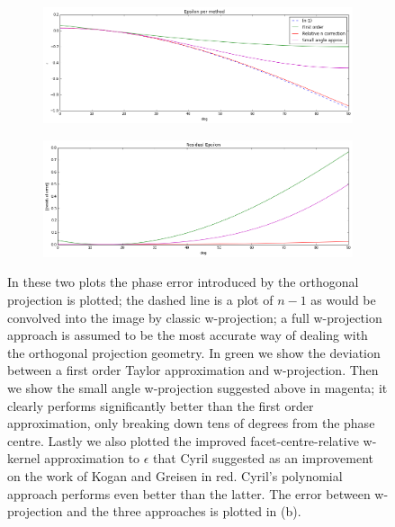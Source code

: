 \begin{figure}[h]
  \begin{mdframed}
    \centering
    \begin{subfigure}[b]{0.7\textwidth}
      \centering
      \includegraphics[width=\textwidth]{images/coplanar_error.png}
      \caption{}
    \end{subfigure}  
    \begin{subfigure}[b]{0.7\textwidth}
      \centering
      \includegraphics[width=\textwidth]{images/coplanar_error_residuals.png}
      \caption{}
    \end{subfigure}
    \caption[Coplanar faceting error]{In these two plots the phase error introduced by the orthogonal projection is plotted; the dashed line is a plot of $n-1$ as
    would be convolved into the image by classic w-projection; a full w-projection approach is assumed to be the most accurate way of dealing with the orthogonal projection geometry.
    In green we show the deviation between a first order Taylor approximation and w-projection\cite{aipsfaceting}. Then we show the small angle w-projection
    suggested above in magenta; it clearly performs significantly better than the first order approximation, only breaking down tens of degrees from the phase centre. Lastly we also
    plotted the improved facet-centre-relative w-kernel approximation to $\epsilon$ that Cyril\cite{tassefaceting} suggested as an improvement on the work of 
    Kogan and Greisen \cite{aipsfaceting} in red. Cyril's polynomial approach \cite{tassefaceting} performs even better than the latter. The error between w-projection and the three
    approaches is plotted in (b).}
    \label{fig_error}
  \end{mdframed}
\end{figure}

